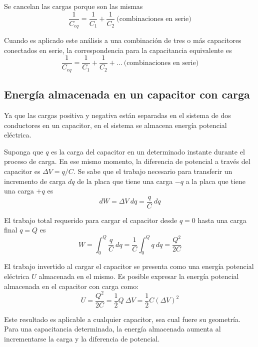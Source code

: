       \PN Se cancelan las cargas porque son las mismas
      \begin{equation*}
        \frac{1}{C_{eq}} = \frac{1}{C_{1}} + \frac{1}{C_{2}} \ \text{(combinaciones en serie)}
      \end{equation*}

      \PN Cuando es aplicado este análisis a una combinación de tres o más capacitores conectados en serie, la
      correspondencia para la capacitancia equivalente es
      \begin{equation*}
        \frac{1}{C_{eq}} = \frac{1}{C_{1}} + \frac{1}{C_{2}} + \dotsc \ \text{(combinaciones en serie)}
      \end{equation*}

  \subsection{Energía almacenada en un capacitor con carga}
    \PN Ya que las cargas positiva y negativa están separadas en el sistema de dos conductores en un capacitor, en el
    sistema se almacena energía potencial eléctrica.

    \VS
    \PN Suponga que $q$ es la carga del capacitor en un determinado instante durante el proceso de carga. En ese mismo
    momento, la diferencia de potencial a través del capacitor es $\Delta V = q/C$. Se sabe que el trabajo necesario
    para transferir un incremento de carga $dq$ de la placa que tiene una carga $-q$ a la placa que tiene una carga $+q$
    es
    \begin{equation*}
      dW = \Delta V \ dq = \frac{q}{C} \ dq
    \end{equation*}

    \PN El trabajo total requerido para cargar el capacitor desde $q = 0$ hasta una carga final $q = Q$ es
    \begin{equation*}
      W = \int_{0}^{Q} \frac{q}{C} \ dq = \frac{1}{C} \int_{0}^{Q} q \ dq = \frac{Q^{2}}{2C}
    \end{equation*}

    \PN El trabajo invertido al cargar el capacitor se presenta como una energía potencial eléctrica $U$ almacenada en
    el mismo. Es posible expresar la energía potencial almacenada en el capacitor con carga como:
    \begin{equation*}
      U = \frac{Q^{2}}{2C} = \frac{1}{2} Q \ \Delta V = \frac{1}{2} C (\Delta V)^{2}
    \end{equation*}

    \PN Este resultado es aplicable a cualquier capacitor, sea cual fuere su geometría. Para una capacitancia
    determinada, la energía almacenada aumenta al incrementarse la carga y la diferencia de potencial.


